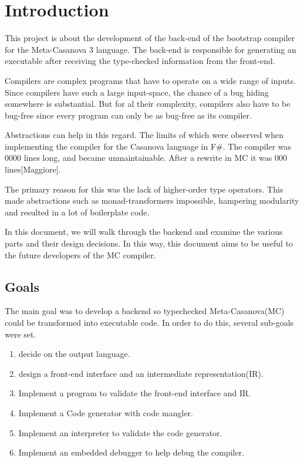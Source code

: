 \section{Introduction}
This project is about the development of the back-end of the bootstrap compiler for the Meta-Casanova 3 language.
The back-end is responsible for generating an executable after receiving the type-checked information from the front-end.

Compilers are complex programs that have to operate on a wide range of inputs.
Since compilers have such a large input-space, the chance of a bug hiding somewhere is substantial. 
But for al their complexity, compilers also have to be bug-free since every program can only be as bug-free as its compiler.

Abstractions can help in this regard.
The limits of which were observed when implementing the compiler for the Casanova language in F\#.
The compiler was 0000 lines long, and became unmaintainable.
After a rewrite in MC it was 000 lines[Maggiore].

The primary reason for this was the lack of higher-order type operators.
This made abstractions such as monad-transformers impossible, hampering modularity and resulted in a lot of boilerplate code.

In this document, we will walk through the backend and examine the various parts and their design decisions.
In this way, this document aims to be useful to the future developers of the MC compiler.

\subsection{Goals}

The main goal was to develop a backend so typechecked Meta-Casanova(MC) could be transformed into executable code.
In order to do this, several sub-goals were set.

\begin{enumerate}
    \item decide on the output language.
    \item design a front-end interface and an intermediate representation(IR).
    \item Implement a program to validate the front-end interface and IR.
    \item Implement a Code generator with code mangler.
    \item Implement an interpreter to validate the code generator.
    \item Implement an embedded debugger to help debug the compiler.
\end{enumerate}

